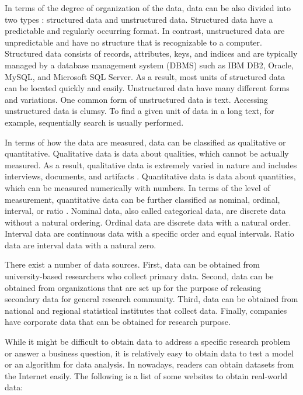 \documentclass[]{book}
\theoremstyle{definition}
\theoremstyle{definition}
\theoremstyle{definition}
\theoremstyle{remark}
\begin{document}
In terms of the degree of organization of the data, data can be also
divided into two types
\citep{inmon2014, leary2013bigdata, hashem2015bigdata, abdullah2013data, pries2015}:
structured data and unstructured data. Structured data have a
predictable and regularly occurring format. In contrast, unstructured
data are unpredictable and have no structure that is recognizable to a
computer. Structured data consists of records, attributes, keys, and
indices and are typically managed by a database management system (DBMS)
such as IBM DB2, Oracle, MySQL, and Microsoft SQL Server. As a result,
most units of structured data can be located quickly and easily.
Unstructured data have many different forms and variations. One common
form of unstructured data is text. Accessing unstructured data is
clumsy. To find a given unit of data in a long text, for example,
sequentially search is usually performed.

In terms of how the data are measured, data can be classified as
qualitative or quantitative. Qualitative data is data about qualities,
which cannot be actually measured. As a result, qualitative data is
extremely varied in nature and includes interviews, documents, and
artifacts \citep{miles2014}. Quantitative data is data about quantities,
which can be measured numerically with numbers. In terms of the level of
measurement, quantitative data can be further classified as nominal,
ordinal, interval, or ratio \citep{gan2011}. Nominal data, also called
categorical data, are discrete data without a natural ordering. Ordinal
data are discrete data with a natural order. Interval data are
continuous data with a specific order and equal intervals. Ratio data
are interval data with a natural zero.

There exist a number of data sources. First, data can be obtained from
university-based researchers who collect primary data. Second, data can
be obtained from organizations that are set up for the purpose of
releasing secondary data for general research community. Third, data can
be obtained from national and regional statistical institutes that
collect data. Finally, companies have corporate data that can be
obtained for research purpose.

While it might be difficult to obtain data to address a specific
research problem or answer a business question, it is relatively easy to
obtain data to test a model or an algorithm for data analysis. In
nowadays, readers can obtain datasets from the Internet easily. The
following is a list of some websites to obtain real-world data:
\end{document}
